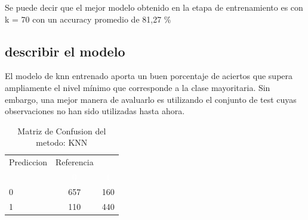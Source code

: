 \documentclass[]{article}
\begin{document}
Se puede decir que el mejor modelo obtenido en la etapa de entrenamiento
es con k = 70 con un accuracy promedio de 81,27 \%

\hypertarget{describir-el-modelo}{%
\subsection{describir el modelo}\label{describir-el-modelo}}

El modelo de knn entrenado aporta un buen porcentaje de aciertos que
supera ampliamente el nivel mínimo que corresponde a la clase
mayoritaria. Sin embargo, una mejor manera de avaluarlo es utilizando el
conjunto de test cuyas observaciones no han sido utilizadas hasta ahora.

\begin{table}[!h]

\caption{\label{tab:MatrizConf_KNN}Matriz de Confusion del metodo: KNN }
\centering
\begin{tabular}[t]{lcc}
\toprule
\multicolumn{1}{c}{Prediccion} & \multicolumn{1}{c}{Referencia} & \multicolumn{1}{c}{ } \\
\cmidrule(l{3pt}r{3pt}){1-1} \cmidrule(l{3pt}r{3pt}){2-2}
\rowcolor{black}  \multicolumn{1}{c}{\textcolor{white}{\textbf{ }}} & \multicolumn{1}{c}{\textcolor{white}{\textbf{0}}} & \multicolumn{1}{c}{\textcolor{white}{\textbf{1}}}\\
\midrule
\rowcolor{gray!6}  0 & 657 & 160\\
1 & 110 & 440\\
\bottomrule
\end{tabular}
\end{table}
\end{document}
